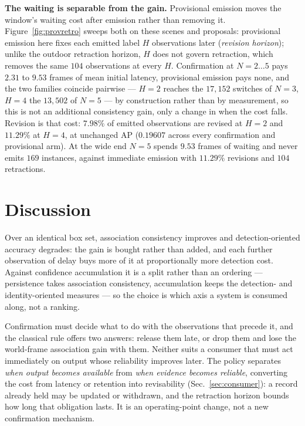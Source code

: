 

\noindent\textbf{The waiting is separable from the gain.} Provisional
emission moves the window's waiting cost after emission rather than removing
it. Figure~\ref{fig:provretro} sweeps both on these scenes and proposals:
provisional emission here fixes each emitted label $H$ observations later
(\emph{revision horizon}); unlike the outdoor retraction horizon, $H$ does not
govern retraction, which removes the same $104$ observations at every $H$. Confirmation
at $N{=}2{\ldots}5$ pays $2.31$ to $9.53$ frames of mean initial
latency, provisional emission pays none, and the two
families coincide pairwise --- $H{=}2$ reaches the $17{,}152$ switches of
$N{=}3$, $H{=}4$ the $13{,}502$ of $N{=}5$ --- by construction rather than by
measurement, so this is not an additional consistency gain, only a change in
when the cost falls. Revision is that cost: $7.98\%$ of emitted observations
are revised at $H{=}2$ and $11.29\%$ at $H{=}4$, at unchanged AP ($0.19607$
across every confirmation and provisional arm). At the wide end $N{=}5$ spends
$9.53$ frames of waiting and never emits $169$ instances, against immediate
emission with $11.29\%$ revisions and $104$ retractions.


\section{Discussion}
\label{sec:discussion}

Over an identical box set, association consistency improves and
detection-oriented accuracy degrades: the gain is bought rather than added, and
each further observation of delay buys more of it at proportionally more
detection cost. Against confidence accumulation it is a split rather than an
ordering --- persistence takes association consistency, accumulation keeps the
detection- and identity-oriented measures --- so the choice is which axis a
system is consumed along, not a ranking.

Confirmation must decide what to do with the observations that precede it, and
the classical rule offers two answers: release them late, or drop them and
lose the world-frame association gain with them. Neither suits a consumer that
must act immediately on output whose reliability improves later. The policy
separates \emph{when output becomes available} from \emph{when evidence
becomes reliable}, converting the cost from latency or retention into
revisability (Sec.~\ref{sec:consumer}): a record already held may be updated or withdrawn, and the
retraction horizon bounds how long that obligation lasts. It is an
operating-point change, not a new confirmation mechanism.

